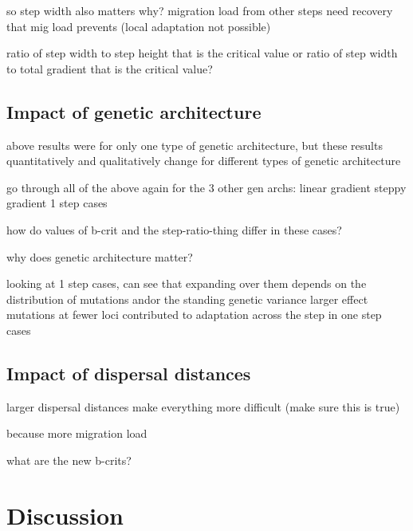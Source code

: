 	so step width also matters
		why?
		migration load from other steps
		need recovery that mig load prevents (local adaptation not possible)
		
		ratio of step width to step height that is the critical value
		or ratio of step width to total gradient that is the critical value?

\subsection{Impact of genetic architecture}

above results were for only one type of genetic architecture, but these results quantitatively and qualitatively change for different types of genetic architecture

go through all of the above again for the 3 other gen archs:
	linear gradient
	steppy gradient
	1 step cases

how do values of b-crit and the step-ratio-thing differ in these cases?


why does genetic architecture matter?

	looking at 1 step cases, can see that expanding over them depends on the distribution of mutations and\/or the standing genetic variance
	larger effect mutations at fewer loci contributed to adaptation across the step in one step cases
	
\subsection{Impact of dispersal distances}

larger dispersal distances make everything more difficult (make sure this is true)

because more migration load

what are the new b-crits?


\section{Discussion}





